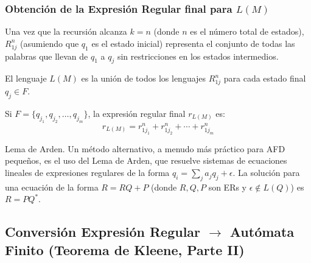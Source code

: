 \begin{figure}[H]
    \centering
    \label{fig:kleene_formula}
\end{figure}

\subsubsection{Obtención de la Expresión Regular final para $L(M)$} %

Una vez que la recursión alcanza $k=n$ (donde $n$ es el número total de estados), $R_{1j}^n$ (asumiendo que $q_1$ es el estado inicial) representa el conjunto de todas las palabras que llevan de $q_1$ a $q_j$ sin restricciones en los estados intermedios.

El lenguaje $L(M)$ es la unión de todos los lenguajes $R_{1j}^n$ para cada estado final $q_j \in F$.

Si $F = \{q_{j_1}, q_{j_2}, \ldots, q_{j_m}\}$, la expresión regular final $r_{L(M)}$ es:
\[ r_{L(M)} = r_{1j_1}^n + r_{1j_2}^n + \cdots + r_{1j_m}^n \]

\begin{anotacion}{Lema de Arden.}
Un método alternativo, a menudo más práctico para AFD pequeños, es el uso del Lema de Arden, que resuelve sistemas de ecuaciones lineales de expresiones regulares de la forma $q_i = \sum_{j} a_j q_j + \epsilon$. La solución para una ecuación de la forma $R = RQ + P$ (donde $R, Q, P$ son ERs y $\epsilon \notin L(Q)$) es $R = PQ^*$.
\end{anotacion}

\subsection{Conversión Expresión Regular $\to$ Autómata Finito (Teorema de Kleene, Parte II)} %

